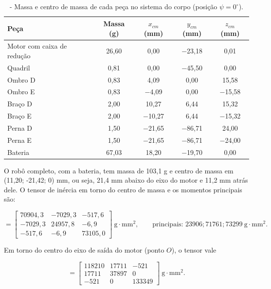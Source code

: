 \begin{table}[H]
\centering
\caption{\label{tab:instancias}- Massa e centro de massa de cada peça no sistema do corpo (posição $\psi=0^\circ$).}
\vspace*{.1cm}
\begin{tabular}{|l|c|c|c|c|}
\hline
\textbf{Peça} & \textbf{Massa (g)} & \textbf{$x_{cm}$ (mm)} & \textbf{$y_{cm}$ (mm)} & \textbf{$z_{cm}$ (mm)} \\
\hline
Motor com caixa de redução & 26,60 & 0,00 & $-$23,18 & 0,01 \\
\hline
Quadril & 0,81 & 0,00 & $-$45,50 & 0,00 \\
\hline
Ombro D & 0,83 & 4,09 & 0,00 & 15,58 \\
\hline
Ombro E & 0,83 & $-$4,09 & 0,00 & $-$15,58 \\
\hline
Braço D & 2,00 & 10,27 & 6,44 & 15,32 \\
\hline
Braço E & 2,00 & $-$10,27 & 6,44 & $-$15,32 \\
\hline
Perna D & 1,50 & $-$21,65 & $-$86,71 & 24,00 \\
\hline
Perna E & 1,50 & $-$21,65 & $-$86,71 & $-$24,00 \\
\hline
Bateria & 67,03 & 18,20 & $-$19,70 & 0,00 \\
\hline
\end{tabular}
\end{table}

O robô completo, com a bateria, tem massa de 103,1 g e centro de massa em (11{,}20; -21{,}42; 0) mm, ou seja, 21,4 mm abaixo do eixo do motor e 11,2 mm atrás dele. O tensor de inércia em torno do centro de massa e os momentos principais são:

\begin{equation*}
[I^*_{\text{robô}}] = \begin{bmatrix}70904{,}3 & -7029{,}3 & -517{,}6 \\
-7029{,}3 & 24957{,}8 & -6{,}9 \\
-517{,}6 & -6{,}9 & 73105{,}0
\end{bmatrix}\ \text{g}\cdot\text{mm}^2, \qquad \text{principais: } 23906; 71761; 73299\ \text{g}\cdot\text{mm}^2.
\end{equation*}

\noindent Em torno do centro do eixo de saída do motor (ponto $O$), o tensor vale

\begin{equation*}
[I_{O,\text{robô}}] = \begin{bmatrix}118210 & 17711 & -521 \\
17711 & 37897 & 0 \\
-521 & 0 & 133349
\end{bmatrix}\ \text{g}\cdot\text{mm}^2.
\end{equation*}

